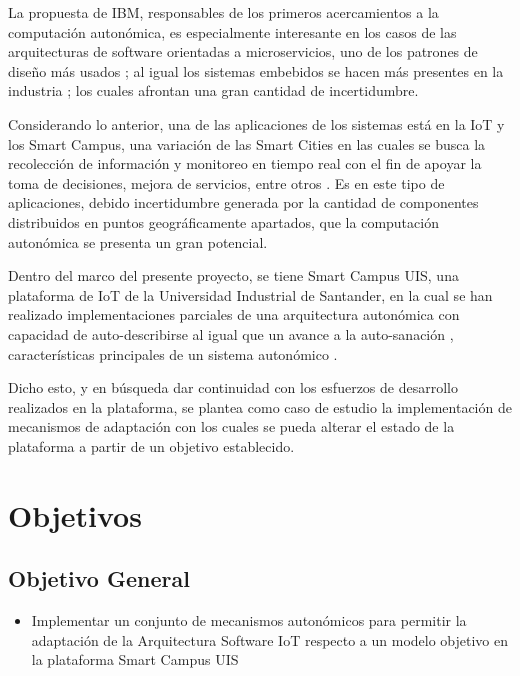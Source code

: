 \documentclass[12pt]{article}
\begin{document}
    La propuesta de IBM, responsables de los primeros acercamientos a la computación autonómica, es especialmente interesante en los casos de las arquitecturas de software orientadas a microservicios, uno de los patrones de diseño más usados \cite{forrester_research_2019}; al igual los sistemas embebidos se hacen más presentes en la industria \cite{deichmann_2022}; los cuales afrontan una gran cantidad de incertidumbre. 
    
    Considerando lo anterior, una de las aplicaciones de los sistemas está en la IoT y los Smart Campus, una variación de las Smart Cities en las cuales se busca la recolección de información y monitoreo en tiempo real con el fin de apoyar la toma de decisiones, mejora de servicios, entre otros \cite{MinAllah2020}. Es en este tipo de aplicaciones, debido incertidumbre generada por la cantidad de componentes distribuidos en puntos geográficamente apartados, que la computación autonómica se presenta un gran potencial. 

    Dentro del marco del presente proyecto, se tiene Smart Campus UIS, una plataforma de IoT de la Universidad Industrial de Santander, en la cual se han realizado implementaciones parciales de una arquitectura autonómica con capacidad de auto-describirse al igual que un avance a la auto-sanación \cite{henry_2020}, características principales de un sistema autonómico \cite{horn_2001}. 
    
    Dicho esto, y en búsqueda dar continuidad con los esfuerzos de desarrollo realizados en la plataforma, se plantea como caso de estudio la implementación de mecanismos de adaptación con los cuales se pueda alterar el estado de la plataforma a partir de un objetivo establecido.  

    \pagebreak

    \section{Objetivos}
    \subsection{Objetivo General}
    \begin{itemize}

        \item Implementar un conjunto de mecanismos autonómicos para permitir la adaptación de la Arquitectura Software IoT respecto a un modelo objetivo en la plataforma Smart Campus UIS

    \end{itemize}
\end{document}
